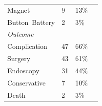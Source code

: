 \begin{table}[htbp]
\begin{tabular}{p{4cm} p{1cm} p{2cm} p{9cm}}
\mbox{\hspace{1em}Magnet} & 9 & 13\% & \cite{Ali_2020f, Bhumi_2024f, Cauchi_2002, Liu_2005, Naji_2012f, Ohno_2005, Tanrikulu_2015e, Tay_2004, Wildhaber_2005} \\
\mbox{\hspace{1em}Button Battery} & 2 & 3\% & \cite{Berry_2021e, Bhumi_2024f} \\
\multicolumn{4}{l}{\textit{Outcome}} \\ 
\mbox{\hspace{1em}Complication} & 47 & 66\% &  \\
\mbox{\hspace{1em}Surgery} & 43 & 61\% &  \\
\mbox{\hspace{1em}Endoscopy} & 31 & 44\% &  \\
\mbox{\hspace{1em}Conservative} & 7 & 10\% &  \\
\mbox{\hspace{1em}Death} & 2 & 3\% &  \\
\bottomrule
\end{tabular}
\end{table}